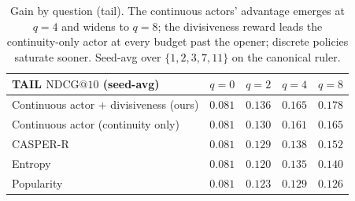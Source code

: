 \documentclass[11pt]{article}
\begin{document}
\begin{table}[h]\centering
\begin{tabular}{lcccc}
\toprule
TAIL $\mathrm{NDCG@10}$ (seed-avg) & $q{=}0$ & $q{=}2$ & $q{=}4$ & $q{=}8$ \\
\midrule
Continuous actor $+$ divisiveness (ours) & $0.081$ & $0.136$ & $\mathbf{0.165}$ & $\mathbf{0.178}$ \\
Continuous actor (continuity only) & $0.081$ & $0.130$ & $0.161$ & $0.165$ \\
CASPER-R & $0.081$ & $0.129$ & $0.138$ & $0.152$ \\
Entropy & $0.081$ & $0.120$ & $0.135$ & $0.140$ \\
Popularity & $0.081$ & $0.123$ & $0.129$ & $0.126$ \\
\bottomrule
\end{tabular}
\caption{Gain by question (tail). The continuous actors' advantage emerges at $q{=}4$ and widens to $q{=}8$; the
divisiveness reward leads the continuity-only actor at every budget past the opener; discrete policies saturate sooner.
Seed-avg over $\{1,2,3,7,11\}$ on the canonical ruler.}\label{tab:qcurve}
\end{table}
\end{document}
